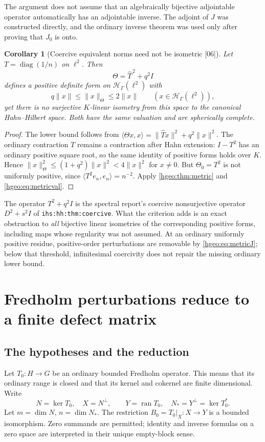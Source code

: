 \documentclass[11pt,letterpaper]{article}
\numberwithin{equation}{section}
\newtheorem{corollary}[corollary]{Corollary}
\theoremstyle{definition}
\theoremstyle{remark}
\newcommand{\K}{K}
\newcommand{\HH}[1]{\mathscr H_\Gamma(#1)}
\newcommand{\ran}{\operatorname{ran}}
\newcommand{\diag}{\operatorname{diag}}
\newcommand{\ip}[2]{\langle #1,#2\rangle}
\newcommand{\norm}[1]{\lVert #1\rVert}
\newcommand{\src}[1]{\textup{\textsf{\small[#1]}}}
\newcommand{\replabel}[1]{\nolinkurl{#1}}
\begin{document}
The argument does not assume that an algebraically bijective adjointable
operator automatically has an adjointable inverse. The adjoint of $J$ was
constructed directly, and the ordinary inverse theorem was used only after
proving that $J_0$ is onto.

\begin{corollary}[Coercive equivalent norms need not be isometric \src{06}]
\label{hgeo:cor:coercivemetric}
Let $T=\diag(1/n)$ on $\ell^2$. Then
\[
 \Theta=\widehat T^{\,2}+q^2I
\]
defines a positive definite form on $\HH{\ell^2}$ with
\begin{equation}\label{hgeo:eq:coercivenorm}
 q\norm{x}\le\norm{x}_\Theta\le 2\norm{x}\qquad(x\in\HH{\ell^2}),
\end{equation}
yet there is no surjective $\K$-linear isometry from this space to the
canonical Hahn--Hilbert space. Both have the same valuation and are
spherically complete.
\end{corollary}
\begin{proof}
The lower bound follows from
$\ip{\Theta x}{x}=\norm{\widehat Tx}^2+q^2\norm{x}^2$.
The ordinary contraction $T$ remains a contraction after Hahn extension:
$I-T^2$ has an ordinary positive square root, so the same identity of
positive forms holds over $\K$. Hence
$\norm{x}_\Theta^2\le(1+q^2)\norm{x}^2<4\norm{x}^2$ for $x\ne0$.
But $\Theta_0=T^2$ is not uniformly positive, since
$\ip{T^2e_n}{e_n}=n^{-2}$. Apply \cref{hgeo:thm:metric} and
\eqref{hgeo:eq:metricval}.
\end{proof}

The operator $T^2+q^2I$ is the spectral report's coercive nonsurjective
operator $D^2+s^2I$ of \replabel{ihs:hh:thm:coercive}. What the criterion adds
is an exact obstruction to \emph{all} bijective linear isometries of the
corresponding positive forms, including maps whose regularity was not
assumed. At an ordinary uniformly positive residue, positive-order
perturbations are removable by \eqref{hgeo:eq:metricJ}; below that
threshold, infinitesimal coercivity does not repair the missing ordinary
lower bound.

\section{Fredholm perturbations reduce to a finite defect matrix}
\label{hgeo:sec:schur}

\subsection{The hypotheses and the reduction}
Let $T_0:H\to G$ be an ordinary bounded Fredholm operator. This means
that its ordinary range is closed and that its kernel and cokernel
are finite dimensional. Write
\[
 N=\ker T_0,\quad X=N^\perp,\qquad
 Y=\ran T_0,\quad N_*=Y^\perp=\ker T_0^*.
\]
Let $m=\dim N$, $n=\dim N_*$. The restriction
$B_0=T_0|_X:X\to Y$ is a bounded isomorphism. Zero summands are permitted;
identity and inverse formulas on a zero space are interpreted in their
unique empty-block sense.
\end{document}
